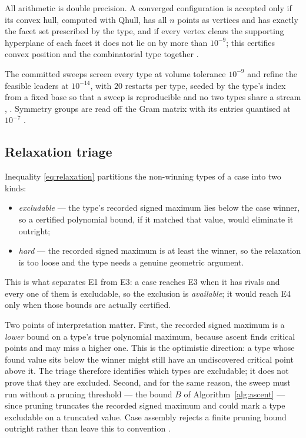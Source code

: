 All arithmetic is double precision. A converged configuration is accepted only
if its convex hull, computed with Qhull, has all $n$ points as vertices and has
exactly the facet set prescribed by the type, and if every vertex clears the
supporting hyperplane of each facet it does not lie on by more than $10^{-9}$;
this certifies convex position and the combinatorial type together
.

The committed sweeps screen every type at volume tolerance $10^{-9}$ and refine
the feasible leaders at $10^{-14}$, with $20$ restarts per type, seeded by the
type's index from a fixed base so that a sweep is reproducible and no two types
share a stream , . Symmetry groups are read
off the Gram matrix with its entries quantised at $10^{-7}$ .

\subsection{Relaxation triage}
\label{sec:triage}

Inequality \eqref{eq:relaxation} partitions the non-winning types of a case
into two kinds:
\begin{itemize}
  \item \emph{excludable} --- the type's recorded signed maximum lies below
    the case winner, so a certified polynomial bound, if it matched that
    value, would eliminate it outright;
  \item \emph{hard} --- the recorded signed maximum is at least the winner, so the
    relaxation is too loose and the type needs a genuine geometric argument.
\end{itemize}
This is what separates E1 from E3: a case reaches E3 when it has rivals and
every one of them is excludable, so the exclusion is \emph{available}; it would
reach E4 only when those bounds are actually certified.

Two points of interpretation matter. First, the recorded signed maximum
is a \emph{lower} bound on a type's true polynomial maximum, because ascent
finds critical points and may miss a higher one. This is the optimistic
direction: a type whose found value sits below the winner might still have an
undiscovered critical point above it. The triage therefore identifies which
types are excludable; it does not prove that they are excluded. Second, and for
the same reason, the sweep must run without a pruning threshold --- the bound
$B$ of Algorithm~\ref{alg:ascent} --- since pruning truncates the recorded
signed maximum and could mark a type excludable on a truncated value. Case
assembly rejects a finite pruning bound outright rather than leave this to
convention .
